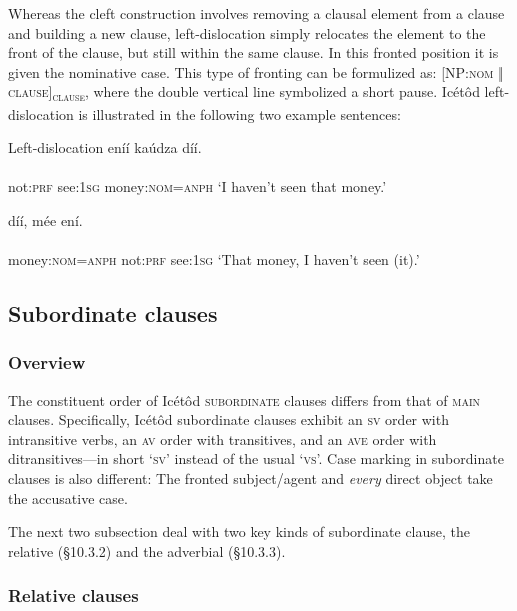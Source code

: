 Whereas the cleft construction involves removing a clausal element from a clause and building a new clause, left-dislocation simply relocates the element to the front of the clause, but still within the same clause. In this fronted position it is given the nominative case. This type of fronting can be formulized as: [NP:\textsc{nom} \textsc{‖}\textsc{ clause]}\textsc{\textsubscript{clause}}, where the double vertical line symbolized a short pause. Icétôd left-dislocation is illustrated in the following two example sentences:




Left-dislocation
\ea\label{ex:}
   eníí     kaúdza díí. \\
    \\
not:\textsc{prf}   see:\textsc{1sg}   money:\textsc{nom}=\textsc{anph}
\glt ‘I haven’t seen that money.’ 
\z




\ea\label{ex:}
 díí,     mée     ení. \\
    \\
money:\textsc{nom}=\textsc{anph}   not:\textsc{prf}   see:\textsc{1sg}
\glt ‘That money, I haven’t seen (it).’ 
\z






\subsection{Subordinate clauses}
\subsubsection{Overview}

The constituent order of Icétôd \textsc{subordinate} clauses differs from that of \textsc{main} clauses. Specifically, Icétôd subordinate clauses exhibit an \textsc{sv} order with intransitive verbs, an \textsc{av} order with transitives, and an \textsc{ave} order with ditransitives—in short ‘\textsc{sv}’ instead of the usual ‘\textsc{vs}’. Case marking in subordinate clauses is also different: The fronted subject/agent and \textit{every} direct object take the accusative case. 

The next two subsection deal with two key kinds of subordinate clause, the relative (§10.3.2) and the adverbial (§10.3.3).


\subsubsection{Relative clauses}

